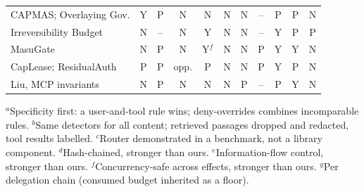 \begin{table}[h]
\begin{tabular}{lcccccccccc}
CAPMAS; Overlaying Gov. & Y & P & N & N & N & N & -- & P & P & N \\
Irreversibility Budget & N & -- & N & Y & N & N & -- & Y & P & P \\
MasuGate & N & P & N & Y$^f$ & N & N & P & Y & Y & N \\
CapLease; ResidualAuth & P & P & opp. & P & N & N & P & Y & P & N \\
Liu, MCP invariants & N & P & N & N & N & P & -- & P & Y & N \\
\bottomrule
\end{tabular}
\par\smallskip\parbox{\textwidth}{\footnotesize $^a$Specificity first: a user-and-tool rule wins; deny-overrides combines incomparable rules. $^b$Same detectors for all content; retrieved passages dropped and redacted, tool results labelled. $^c$Router demonstrated in a benchmark, not a library component. $^d$Hash-chained, stronger than ours. $^e$Information-flow control, stronger than ours. $^f$Concurrency-safe across effects, stronger than ours. $^g$Per delegation chain (consumed budget inherited as a floor).}
\end{table}
